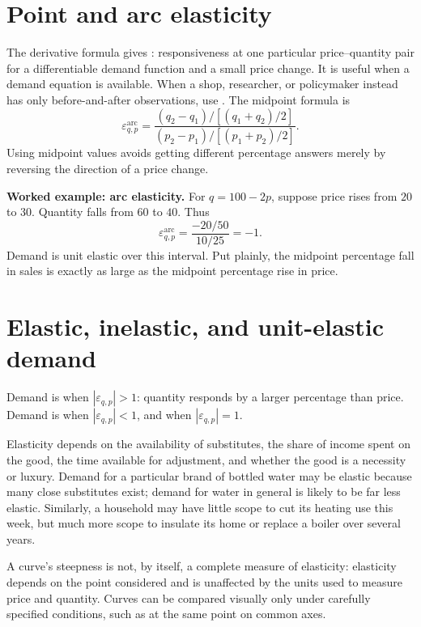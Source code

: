 \section{Point and arc elasticity}

The derivative formula gives : responsiveness at one
particular price--quantity pair for a differentiable demand function and a
small price change. It is useful when a demand equation is available. When a
shop, researcher, or policymaker instead has only before-and-after
observations, use . The midpoint formula is
\[
\varepsilon^{\mathrm{arc}}_{q,p}
=
\frac{(q_2-q_1)/\left[(q_1+q_2)/2\right]}
     {(p_2-p_1)/\left[(p_1+p_2)/2\right]}.
\]
Using midpoint values avoids getting different percentage answers merely by
reversing the direction of a price change.

\begin{keyidea}
\textbf{Worked example: arc elasticity.}
For $q=100-2p$, suppose price rises from $20$ to $30$. Quantity falls from
$60$ to $40$. Thus
\[
\varepsilon^{\mathrm{arc}}_{q,p}
=
\frac{-20/50}{10/25}
=-1.
\]
Demand is unit elastic over this interval. Put plainly, the midpoint
percentage fall in sales is exactly as large as the midpoint percentage rise
in price.
\end{keyidea}

\section{Elastic, inelastic, and unit-elastic demand}

Demand is  when $|\varepsilon_{q,p}|>1$: quantity responds by a larger percentage than price. Demand is  when $|\varepsilon_{q,p}|<1$, and  when $|\varepsilon_{q,p}|=1$.

Elasticity depends on the availability of substitutes, the share of income spent on the good, the time available for adjustment, and whether the good is a necessity or luxury. Demand for a particular brand of bottled water may be elastic because many close substitutes exist; demand for water in general is likely to be far less elastic. Similarly, a household may have little scope to cut its heating use this week, but much more scope to insulate its home or replace a boiler over several years.

A curve's steepness is not, by itself, a complete measure of elasticity:
elasticity depends on the point considered and is unaffected by the units used
to measure price and quantity. Curves can be compared visually only under
carefully specified conditions, such as at the same point on common axes.

